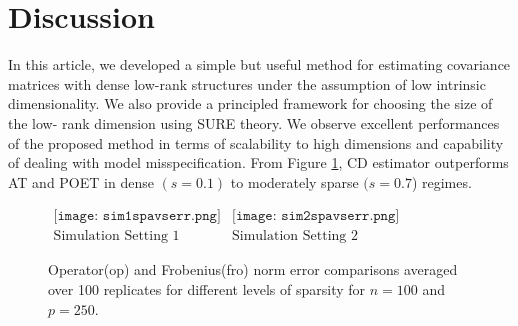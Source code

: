 \documentclass[11pt,oneside]{amsart}
\begin{document}
\section{Discussion}
In this article, we developed a simple but useful method for estimating covariance matrices with dense low-rank structures under the assumption of low intrinsic dimensionality. We also provide a principled framework for choosing the size of the low- rank dimension using SURE theory. We observe excellent performances of the proposed method in terms of scalability to high dimensions and capability of dealing with model misspecification. From Figure \ref{spavserr}, CD estimator outperforms AT and POET in dense $(s = 0.1)$ to moderately sparse $(s =  0.7$) regimes. 
%



\begin{figure}[htp!]
\begin{center}$
\begin{array}{cc}
\texttt{[image: sim1spavserr.png]}&
\texttt{[image: sim2spavserr.png]}\\
\text{Simulation Setting 1} & \text{Simulation Setting 2}
\end{array}$
\end{center}
\caption{Operator(op) and Frobenius(fro) norm error comparisons averaged over 100 replicates for different  levels of sparsity for $n = 100$ and $p = 250$. } 
\label{spavserr} 
\end{figure}
\end{document}
